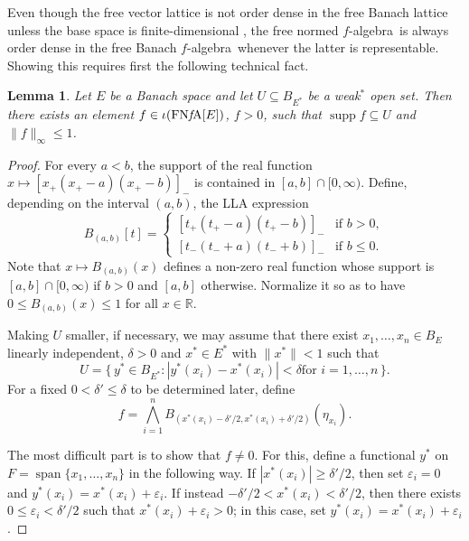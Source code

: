 \documentclass{memo-l}
\newtheorem{lem}[theorem]{Lemma}
\theoremstyle{definition}
\theoremstyle{remark}
\numberwithin{section}{chapter}
\numberwithin{equation}{chapter}
\newcommand\R{\ensuremath{\mathbb{R}}}
\newcommand{\falg}{$f\!$-algebra}
\newcommand{\FNFA}[1]{\operatorname{FN{\it f}\!A}[#1]}
\DeclareMathOperator{\supp}{supp}
\DeclareMathOperator{\barespn}{span}
\begin{document}
Even though the free vector lattice is not order dense in
the free Banach lattice unless the base space is
finite-dimensional \cite{azouzi_dhifaoui2025}, the free normed \falg\ is always order dense
in the free Banach \falg\ whenever the latter is representable.
Showing this requires first the following technical fact.

\begin{lem}\label{lem:bump}
    Let $E$ be a Banach space and let $U\subseteq B_{E^{*}}$ be a
    weak$^*$ open set. Then there exists an element $f \in \iota
    (\FNFA E)$, $f>0$,
    such that $\supp f\subseteq U$ and $\|f\|_\infty \le 1$.
\end{lem}
\begin{proof}
    For every $a<b$, the support of the real function $x\mapsto [x_+(x_+ -a)(x_+ -
    b)]_-$ is contained in $[a,b]\cap
    [0,\infty )$. Define, depending on the interval $(a,b)$, the LLA
    expression
    \[B_{(a,b)}[t]=
    \begin{cases}
        [t_+(t_+ - a)(t_+ - b)]_-&\text{if }b>0,\\
        [t_-(t_- + a)(t_- + b)]_-&\text{if }b\le 0.
    \end{cases}
    \]
    Note that $x \mapsto B_{(a,b)}(x)$ defines a non-zero real
    function whose support is $[a,b]\cap [0,\infty )$ if $b>0$ and
    $[a,b]$ otherwise. Normalize it so as to have $0\le
    B_{(a,b)}(x)\le 1$ for all $x \in \R$.

    Making
    $U$ smaller, if necessary, we may assume that there exist $x_1,\ldots
    ,x_n \in B_E$ linearly independent, $\delta >0$ and $x^{*}\in
    E^{*}$ with $\|x^{*}\|<1$ such that
    \[
    U=\{\, y^{*}\in B_{E^{*}} : |y^{*}(x_i)-x^{*}(x_i)|<\delta  \text{
    for }i=1,\ldots ,n\, \}.
    \]
    For a fixed $0<\delta '\le \delta $ to be determined later,
    define
    \[
    f=\bigwedge_{i=1} ^{n} B_{(x^{*}(x_i)-\delta'/2,x^{*}(x_i)+\delta'/2
    )}(\eta _{x_i}).
    \]

    The most difficult part is to show that
    $f\neq 0$. For this, define a
    functional $y^{*}$ on $F=\barespn\{x_1,\ldots ,x_n\}$ in the
    following way. If $|x^{*}(x_i)|\ge \delta '/2$, then set
    $\varepsilon _i=0$ and $y^{*}(x_i)=x^{*}(x_i)+\varepsilon _i$. If instead $-\delta '/2<x^{*}(x_i)<\delta
    '/2$, then there exists $0\le \varepsilon _i<\delta'/2$ such that
    $x^{*}(x_i)+\varepsilon _i> 0$; in this case, set
    $y^{*}(x_i)=x^{*}(x_i)+\varepsilon _i$.


\end{proof}
\end{document}
